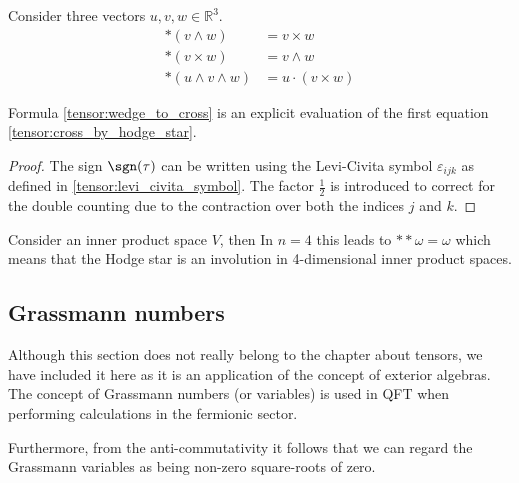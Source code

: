 	\begin{result}
		\label{tensor:hodge_star_vectorcalculus}
		Consider three vectors $u, v, w\in\mathbb{R}^3$.
		\begin{align}
			\ast(v\wedge w) &= v\times w \label{tensor:cross_by_hodge_star}\\
			\ast(v\times w) &= v\wedge w\\
			\ast(u\wedge v\wedge w) &= u\cdot(v\times w)
		\end{align}
	\end{result}
	\begin{remark}
		Formula \ref{tensor:wedge_to_cross} is an explicit evaluation of the first equation \ref{tensor:cross_by_hodge_star}.
		\begin{proof}
			The sign $\sgn(\tau)$ can be written using the Levi-Civita symbol $\varepsilon_{ijk}$ as defined in \ref{tensor:levi_civita_symbol}. The factor $\frac{1}{2}$ is introduced to correct for the double counting due to the contraction over both the indices $j$ and $k$.
		\end{proof}
	\end{remark}
	
	\begin{property}
		Consider an inner product space $V$, then
		In $n=4$ this leads to $\ast\ast\omega = \omega$ which means that the Hodge star is an involution in 4-dimensional inner product spaces.
	\end{property}
	
	
\subsection{Grassmann numbers}

	Although this section does not really belong to the chapter about tensors, we have included it here as it is an application of the concept of exterior algebras. The concept of Grassmann numbers (or variables) is used in QFT when performing calculations in the fermionic sector.
	
	\begin{remark}
		Furthermore, from the anti-commutativity it follows that we can regard the Grassmann variables as being non-zero square-roots of zero.
	\end{remark}
	
